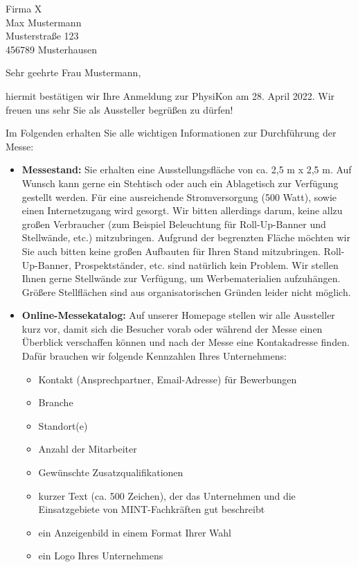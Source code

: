 \documentclass[
  pepbrief,
  fontsize=12pt,
  paper=a4,
  DIV=14,
  parskip=half,
  backaddress=false,
]{scrlttr2}
\author{Lena Linhoff}
\begin{document}
\begin{letter}{%
  Firma X\\
  Max Mustermann\\
  Musterstraße 123\\
  456789 Musterhausen

}
\opening{Sehr geehrte Frau Mustermann,}
hiermit bestätigen wir Ihre Anmeldung zur PhysiKon am 28. April 2022. Wir freuen uns sehr Sie als Aussteller begrüßen zu dürfen!

Im Folgenden erhalten Sie alle wichtigen Informationen zur Durchführung der Messe:

\begin{itemize}
  \item \textbf{Messestand:} Sie erhalten eine Ausstellungsfläche von ca. 2,5 m x 2,5 m.
    Auf Wunsch kann gerne ein Stehtisch oder auch ein Ablagetisch zur Verfügung gestellt werden.
    Für eine ausreichende Stromversorgung (500 Watt), sowie einen Internetzugang wird gesorgt.
    Wir bitten allerdings darum, keine allzu großen Verbraucher (zum Beispiel Beleuchtung für Roll-Up-Banner und Stellwände, etc.) mitzubringen.
    Aufgrund der begrenzten Fläche möchten wir Sie auch bitten keine großen Aufbauten für Ihren Stand mitzubringen.
    Roll-Up-Banner, Prospektständer, etc. sind natürlich kein Problem.
    Wir stellen Ihnen gerne Stellwände zur Verfügung, um Werbematerialien aufzuhängen.
    Größere Stellflächen sind aus organisatorischen Gründen leider nicht möglich.
    \item \textbf{Online-Messekatalog:}
    Auf unserer Homepage stellen wir alle Aussteller kurz vor, damit sich die Besucher vorab oder während der Messe einen Überblick verschaffen können und nach der Messe eine Kontakadresse finden.
    Dafür brauchen wir folgende Kennzahlen Ihres Unternehmens:
    \begin{itemize}
      \item Kontakt (Ansprechpartner, Email-Adresse) für Bewerbungen
      \item Branche
      \item Standort(e)
      \item Anzahl der Mitarbeiter
      \item Gewünschte Zusatzqualifikationen
      \item kurzer Text (ca. 500 Zeichen), der das Unternehmen und die Einsatzgebiete von MINT-Fachkräften gut beschreibt
      \item ein Anzeigenbild in einem Format Ihrer Wahl
      \item ein Logo Ihres Unternehmens
    \end{itemize}


\end{itemize}
\end{letter}
\end{document}
